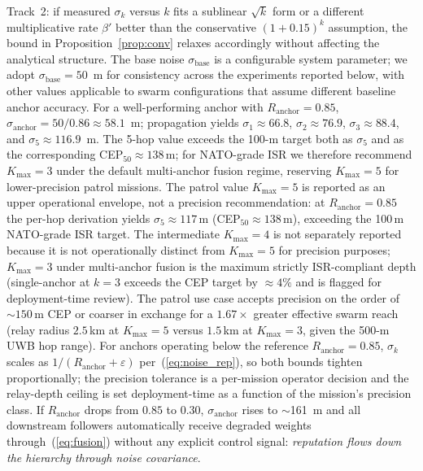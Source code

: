 \documentclass[conference,10pt]{IEEEtran}
\begin{document}
Track~2: if measured $\sigma_k$ versus $k$ fits a sublinear $\sqrt{k}$ form or a different multiplicative rate $\beta'$ better than the conservative $(1+0.15)^k$ assumption, the bound in Proposition~\ref{prop:conv} relaxes accordingly without affecting the analytical structure. The base noise $\sigma_\text{base}$ is a configurable system parameter; we adopt $\sigma_\text{base} = 50$~m for consistency across the experiments reported below, with other values applicable to swarm configurations that assume different baseline anchor accuracy. For a well-performing anchor with $R_\text{anchor} = 0.85$, $\sigma_\text{anchor} = 50/0.86 \approx 58.1$~m; propagation yields $\sigma_1 \approx 66.8$, $\sigma_2 \approx 76.9$, $\sigma_3 \approx 88.4$, and $\sigma_5 \approx 116.9$~m. The 5-hop value exceeds the 100-m target both as $\sigma_5$ and as the corresponding CEP$_{50}\approx 138$\,m; for NATO-grade ISR we therefore recommend $K_\text{max}=3$ under the default multi-anchor fusion regime, reserving $K_\text{max}=5$ for lower-precision patrol missions. The patrol value $K_\text{max}=5$ is reported as an upper operational envelope, not a precision recommendation: at $R_\text{anchor}=0.85$ the per-hop derivation yields $\sigma_5 \approx 117$\,m (CEP$_{50}\approx 138$\,m), exceeding the 100\,m NATO-grade ISR target. The intermediate $K_\text{max}=4$ is not separately reported because it is not operationally distinct from $K_\text{max}=5$ for precision purposes; $K_\text{max}=3$ under multi-anchor fusion is the maximum strictly ISR-compliant depth (single-anchor at $k=3$ exceeds the CEP target by $\approx 4\%$ and is flagged for deployment-time review). The patrol use case accepts precision on the order of $\sim 150$\,m CEP or coarser in exchange for a $1.67\times$ greater effective swarm reach (relay radius $2.5$\,km at $K_\text{max}=5$ versus $1.5$\,km at $K_\text{max}=3$, given the 500-m UWB hop range). For anchors operating below the reference $R_\text{anchor}=0.85$, $\sigma_k$ scales as $1/(R_\text{anchor}+\varepsilon)$ per~(\ref{eq:noise_rep}), so both bounds tighten proportionally; the precision tolerance is a per-mission operator decision and the relay-depth ceiling is set deployment-time as a function of the mission's precision class. If $R_\text{anchor}$ drops from $0.85$ to $0.30$, $\sigma_\text{anchor}$ rises to $\sim$161~m and all downstream followers automatically receive degraded weights through~(\ref{eq:fusion}) without any explicit control signal: \emph{reputation flows down the hierarchy through noise covariance}.
\end{document}

